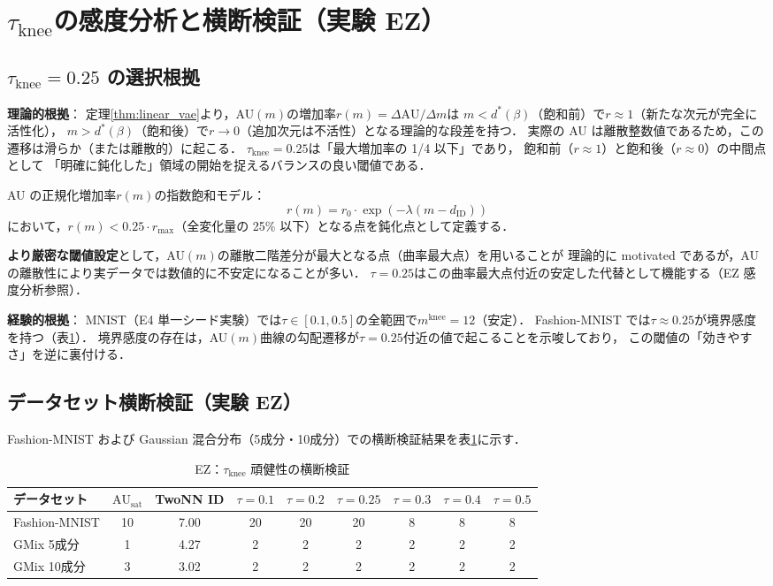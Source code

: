 \documentclass[11pt,a4paper]{jsarticle}
\newcommand{\dID}{d_{\mathrm{ID}}}
\newcommand{\AUsat}{\mathrm{AU}_{\mathrm{sat}}}
\newcommand{\mknee}{m^{\mathrm{knee}}}
\begin{document}
\section{$\tau_{\mathrm{knee}}$の感度分析と横断検証（実験 EZ）}\label{app:tau_knee}

\subsection*{$\tau_{\mathrm{knee}} = 0.25$ の選択根拠}

\textbf{理論的根拠}：
定理\ref{thm:linear_vae}より，AU$(m)$の増加率$r(m) = \Delta\mathrm{AU}/\Delta m$は
$m < d^*(\beta)$（飽和前）で$r \approx 1$（新たな次元が完全に活性化），
$m > d^*(\beta)$（飽和後）で$r \to 0$（追加次元は不活性）となる理論的な段差を持つ．
実際の AU は離散整数値であるため，この遷移は滑らか（または離散的）に起こる．
$\tau_{\mathrm{knee}} = 0.25$は「最大増加率の 1/4 以下」であり，
飽和前（$r \approx 1$）と飽和後（$r \approx 0$）の中間点として
「明確に鈍化した」領域の開始を捉えるバランスの良い閾値である．

AU の正規化増加率$r(m)$の指数飽和モデル：
\begin{equation}
  r(m) = r_0 \cdot \exp(-\lambda (m - \dID))
  \label{eq:knee_curvature}
\end{equation}
において，$r(m) < 0.25 \cdot r_{\max}$（全変化量の 25\% 以下）となる点を鈍化点として定義する．

\textbf{より厳密な閾値設定}として，AU$(m)$の離散二階差分が最大となる点（曲率最大点）を用いることが
理論的に motivated であるが，AU の離散性により実データでは数値的に不安定になることが多い．
$\tau = 0.25$はこの曲率最大点付近の安定した代替として機能する（EZ 感度分析参照）．

\textbf{経験的根拠}：
MNIST（E4 単一シード実験）では$\tau \in [0.1, 0.5]$の全範囲で$\mknee = 12$（安定）．
Fashion-MNIST では$\tau \approx 0.25$が境界感度を持つ（表\ref{tab:ez}）．
境界感度の存在は，AU$(m)$曲線の勾配遷移が$\tau = 0.25$付近の値で起こることを示唆しており，
この閾値の「効きやすさ」を逆に裏付ける．

\subsection*{データセット横断検証（実験 EZ）}

Fashion-MNIST および Gaussian 混合分布（5成分・10成分）での横断検証結果を表\ref{tab:ez}に示す．

\begin{table}[H]
\centering
\caption{EZ：$\tau_{\mathrm{knee}}$ 頑健性の横断検証}
\label{tab:ez}
\small
\begin{tabular}{lcc|cccccc}
\toprule
データセット & $\AUsat$ & TwoNN ID & $\tau=0.1$ & $\tau=0.2$ & $\tau=0.25$ & $\tau=0.3$ & $\tau=0.4$ & $\tau=0.5$ \\
\midrule
Fashion-MNIST & 10 & 7.00 & 20 & 20 & 20 & 8 & 8 & 8 \\
GMix 5成分 & 1 & 4.27 & 2 & 2 & 2 & 2 & 2 & 2 \\
GMix 10成分 & 3 & 3.02 & 2 & 2 & 2 & 2 & 2 & 2 \\
\bottomrule
\end{tabular}
\end{table}
\end{document}
